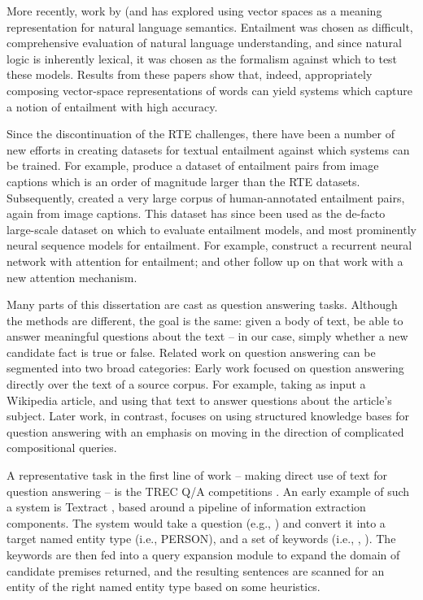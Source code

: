 More recently, work by 
  (and  has explored using vector spaces
  as a meaning representation for natural language semantics.
Entailment was chosen as difficult, comprehensive evaluation of natural language
  understanding, and since natural logic is inherently lexical, it was chosen
  as the formalism against which to test these models.
Results from these papers show that, indeed, appropriately composing
  vector-space representations of words can yield systems which capture a
  notion of entailment with high accuracy.

Since the discontinuation of the RTE challenges, there have been a number of
  new efforts in creating datasets for textual entailment against which
  systems can be trained.
For example,  produce a dataset of entailment
  pairs from image captions which is an order of magnitude larger than the RTE
  datasets.
Subsequently,  created a very large corpus
  of human-annotated entailment pairs, again from image captions.
This dataset has since been used as the de-facto large-scale dataset on which
  to evaluate entailment models, and most prominently neural sequence models for
  entailment.
For example,  construct a recurrent neural network
  with attention for entailment;  and other
  follow up on that work with a new attention mechanism.



%
%
Many parts of this dissertation are cast as question answering tasks.
Although the methods are different, the goal is the same: given a body of text,
  be able to answer meaningful questions about the text -- in our case, simply
  whether a new candidate fact is true or false.
Related work on question answering can be segmented into two broad categories:
Early work focused on question answering directly over the text of a
  source corpus.
For example, taking as input a Wikipedia article, and using that text to answer
  questions about the article's subject.
Later work, in contrast, focuses on using structured knowledge bases for question
  answering with an emphasis on moving in the direction of 
  complicated compositional queries.

A representative task in the first line of work -- making direct use of text
  for question answering -- is the TREC Q/A competitions 
  \cite{key:2001voorhees-trec,key:2006voorhees-trec,key:2007dang-trec,key:2008voorhees-trec}.
An early example of such a system is Textract \cite{key:1999srihari-trec}, based around 
  a pipeline of information extraction components.
The system would take a question (e.g., )
  and convert it into a target named entity type (i.e., PERSON), and a set of keywords
  (i.e., , ).
The keywords are then fed into a query expansion module to expand the domain of candidate
  premises returned, and the resulting sentences are scanned for an entity of the right
  named entity type based on some heuristics.

